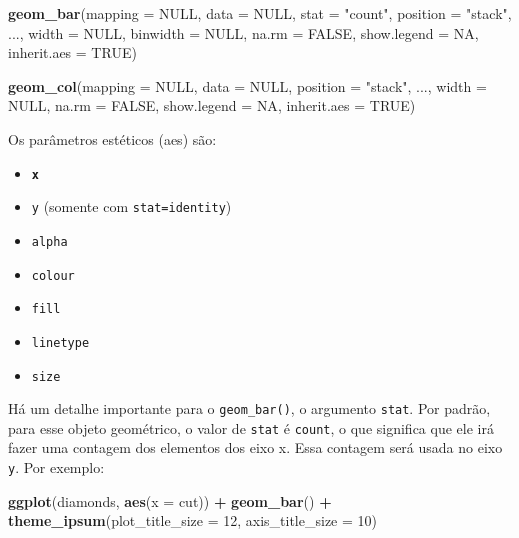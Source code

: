 \documentclass[]{book}
\newenvironment{Shaded}{\begin{snugshade}}{\end{snugshade}}
\newcommand{\KeywordTok}[1]{\textcolor[rgb]{0.13,0.29,0.53}{\textbf{#1}}}
\newcommand{\DataTypeTok}[1]{\textcolor[rgb]{0.13,0.29,0.53}{#1}}
\newcommand{\DecValTok}[1]{\textcolor[rgb]{0.00,0.00,0.81}{#1}}
\newcommand{\StringTok}[1]{\textcolor[rgb]{0.31,0.60,0.02}{#1}}
\newcommand{\OtherTok}[1]{\textcolor[rgb]{0.56,0.35,0.01}{#1}}
\newcommand{\OperatorTok}[1]{\textcolor[rgb]{0.81,0.36,0.00}{\textbf{#1}}}
\newcommand{\NormalTok}[1]{#1}
\providecommand{\tightlist}{%
  \setlength{\itemsep}{0pt}\setlength{\parskip}{0pt}}
\begin{document}
\begin{Shaded}
\begin{Highlighting}[]
\KeywordTok{geom_bar}\NormalTok{(}\DataTypeTok{mapping =} \OtherTok{NULL}\NormalTok{, }\DataTypeTok{data =} \OtherTok{NULL}\NormalTok{, }\DataTypeTok{stat =} \StringTok{"count"}\NormalTok{, }\DataTypeTok{position =} \StringTok{"stack"}\NormalTok{, ...,}
         \DataTypeTok{width =} \OtherTok{NULL}\NormalTok{, }\DataTypeTok{binwidth =} \OtherTok{NULL}\NormalTok{, }\DataTypeTok{na.rm =} \OtherTok{FALSE}\NormalTok{, }\DataTypeTok{show.legend =} \OtherTok{NA}\NormalTok{,}
         \DataTypeTok{inherit.aes =} \OtherTok{TRUE}\NormalTok{)}

\KeywordTok{geom_col}\NormalTok{(}\DataTypeTok{mapping =} \OtherTok{NULL}\NormalTok{, }\DataTypeTok{data =} \OtherTok{NULL}\NormalTok{, }\DataTypeTok{position =} \StringTok{"stack"}\NormalTok{, ...,}
  \DataTypeTok{width =} \OtherTok{NULL}\NormalTok{, }\DataTypeTok{na.rm =} \OtherTok{FALSE}\NormalTok{, }\DataTypeTok{show.legend =} \OtherTok{NA}\NormalTok{, }\DataTypeTok{inherit.aes =} \OtherTok{TRUE}\NormalTok{)}
\end{Highlighting}
\end{Shaded}

Os parâmetros estéticos (aes) são:

\begin{itemize}
\tightlist
\item
  \textbf{\texttt{x}}
\item
  \texttt{y} (somente com \texttt{stat=identity})
\item
  \texttt{alpha}
\item
  \texttt{colour}
\item
  \texttt{fill}
\item
  \texttt{linetype}
\item
  \texttt{size}
\end{itemize}

Há um detalhe importante para o \texttt{geom\_bar()}, o argumento
\texttt{stat}. Por padrão, para esse objeto geométrico, o valor de
\texttt{stat} é \texttt{count}, o que significa que ele irá fazer uma
contagem dos elementos dos eixo x. Essa contagem será usada no eixo
\texttt{y}. Por exemplo:

\begin{Shaded}
\begin{Highlighting}[]
\KeywordTok{ggplot}\NormalTok{(diamonds, }\KeywordTok{aes}\NormalTok{(}\DataTypeTok{x =}\NormalTok{ cut)) }\OperatorTok{+}
\StringTok{  }\KeywordTok{geom_bar}\NormalTok{() }\OperatorTok{+}
\StringTok{  }\KeywordTok{theme_ipsum}\NormalTok{(}\DataTypeTok{plot_title_size =} \DecValTok{12}\NormalTok{,   }
              \DataTypeTok{axis_title_size =} \DecValTok{10}\NormalTok{)}
\end{Highlighting}
\end{Shaded}
\end{document}
